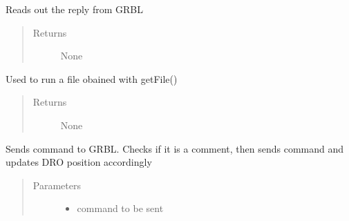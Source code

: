 \documentclass[letterpaper,10pt,english]{sphinxmanual}
\begin{document}
\begin{fulllineitems}
\begin{fulllineitems}
\begin{quote}
\begin{description}
\end{description}\end{quote}

\end{fulllineitems}


\begin{fulllineitems}
\label{\detokenize{index:droogCNC.TwoAxisStage.readOut}}
\sphinxAtStartPar
Reads out the reply from GRBL
\begin{quote}\begin{description}
\item[{Returns}] \leavevmode
\sphinxAtStartPar
None

\end{description}\end{quote}

\end{fulllineitems}


\begin{fulllineitems}
\label{\detokenize{index:droogCNC.TwoAxisStage.runFile}}
\sphinxAtStartPar
Used to run a file obained with getFile()
\begin{quote}\begin{description}
\item[{Returns}] \leavevmode
\sphinxAtStartPar
None

\end{description}\end{quote}

\end{fulllineitems}


\begin{fulllineitems}
\label{\detokenize{index:droogCNC.TwoAxisStage.sendCommand}}
\sphinxAtStartPar
Sends command to GRBL. Checks if it is a comment, then sends command and updates DRO position accordingly
\begin{quote}\begin{description}
\item[{Parameters}] \leavevmode\begin{itemize}
\item {} 
\sphinxAtStartPar
{} \textendash{} command to be sent


\end{itemize}
\end{description}
\end{quote}
\end{fulllineitems}
\end{fulllineitems}
\end{document}
